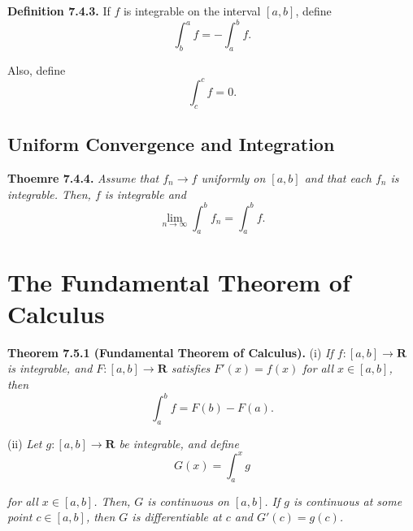 \documentclass[12pt]{report}
\newcommand{\R}{\textbf{R}}
\begin{document}
\noindent \textbf{Definition 7.4.3.} If $f$ is integrable on the interval $[a,b]$, define
\[\int_b^af=-\int_a^bf.\]

\noindent Also, define
\[\int_c^cf=0.\]
\bigskip

\subsection*{Uniform Convergence and Integration}

\noindent \textbf{Thoemre 7.4.4.} \textit{Assume that $f_n\rightarrow f$ uniformly on $[a,b]$ and that each $f_n$ is integrable.  Then, $f$ is integrable and}
\[\lim_{n\rightarrow\infty}\int_a^bf_n=\int_a^bf.\]
\bigskip

\section{The Fundamental Theorem of Calculus}

\noindent \textbf{Theorem 7.5.1 (Fundamental Theorem of Calculus).} (i) \textit{If $f:[a,b]\rightarrow\R$ is integrable, and $F:[a,b]\rightarrow\R$ satisfies $F'(x)=f(x)$ for all $x\in[a,b]$, then}
\[\int_a^bf=F(b)-F(a).\]

(ii) \textit{Let $g:[a,b]\rightarrow\R$ be integrable, and define}
\[G(x)=\int_a^xg\]

\noindent \textit{for all $x\in[a,b]$.  Then, $G$ is continuous on $[a,b]$.  If $g$ is continuous at some point $c\in[a,b]$, then $G$ is differentiable at $c$ and $G'(c)=g(c)$.}
\bigskip
\end{document}
